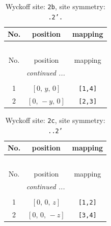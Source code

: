\documentclass[fleqn,8pt]{jsarticle}
\begin{document}
\begin{longtable}{ccc}
\caption{Wyckoff site: {\tt 2b}, site symmetry: {\tt .2'.}}
 \\
 \hline \hline
No. & position & mapping \\ \hline \endfirsthead

\multicolumn{2}{l}{\tablename\ \thetable{}} \\
 \hline \hline
No. & position & mapping \\ \hline \endhead

 \hline \hline
\multicolumn{2}{r}{\footnotesize\it continued ...} \\ \endfoot

 \hline \hline
\multicolumn{2}{r}{} \\ \endlastfoot

1 & $\left[ 0,\, y,\, 0 \right]$ & {\tt [1,4]} \\ \hline
2 & $\left[ 0,\, - y,\, 0 \right]$ & {\tt [2,3]} \\
\end{longtable}
\renewcommand{\arraystretch}{1.2}
\begin{longtable}{ccc}
\caption{Wyckoff site: {\tt 2c}, site symmetry: {\tt ..2'}}
 \\
 \hline \hline
No. & position & mapping \\ \hline \endfirsthead

\multicolumn{2}{l}{\tablename\ \thetable{}} \\
 \hline \hline
No. & position & mapping \\ \hline \endhead

 \hline \hline
\multicolumn{2}{r}{\footnotesize\it continued ...} \\ \endfoot

 \hline \hline
\multicolumn{2}{r}{} \\ \endlastfoot

1 & $\left[ 0,\, 0,\, z \right]$ & {\tt [1,2]} \\ \hline
2 & $\left[ 0,\, 0,\, - z \right]$ & {\tt [3,4]} \\
\end{longtable}
\renewcommand{\arraystretch}{1.2}
\end{document}
